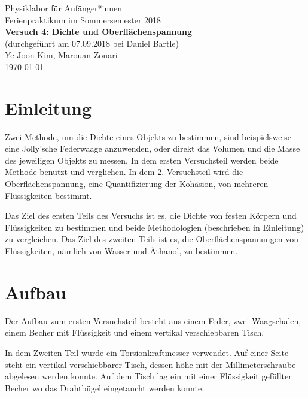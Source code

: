 \documentclass[11pt,a4paper]{article} %
\begin{document}
{
	\centering 
	\large 
	Physiklabor für Anfänger*innen \\
	Ferienpraktikum im Sommersemester 2018 \\[4mm]
	\textbf{\LARGE 
		Versuch 4: Dichte und Oberflächenspannung
	} \\[3mm]
	(durchgeführt am 07.09.2018 bei Daniel Bartle) \\
	Ye Joon Kim, Marouan Zouari\\
	\today \\[10mm]
}

\tableofcontents
\section{Einleitung}
Zwei Methode, um die Dichte eines Objekts zu bestimmen, sind beispielsweise eine Jolly'sche Federwaage anzuwenden, oder direkt das Volumen und die Masse des jeweiligen Objekts zu messen. In dem ersten Versuchsteil werden beide Methode benutzt und verglichen. In dem 2. Versuchsteil wird die Oberflächenspannung, eine Quantifizierung der Kohäsion, von mehreren Flüssigkeiten bestimmt. 

Das Ziel des ersten Teils des Versuchs ist es, die Dichte von festen Körpern und Flüssigkeiten zu bestimmen und beide Methodologien (beschrieben in Einleitung) zu vergleichen. Das Ziel des zweiten Teils ist es, die Oberflächenspannungen von Flüssigkeiten, nämlich von Wasser und Äthanol, zu bestimmen. 

\section{Aufbau}
Der Aufbau zum ersten Versuchsteil besteht aus einem Feder, zwei Waagschalen, einem Becher mit Flüssigkeit und einem vertikal verschiebbaren Tisch. 

In dem Zweiten Teil wurde ein Torsionkraftmesser verwendet. Auf einer Seite steht ein vertikal verschiebbarer Tisch, dessen höhe mit der Millimeterschraube abgelesen werden konnte. Auf dem Tisch lag ein mit einer Flüssigkeit gefüllter Becher wo das Drahtbügel eingetaucht werden konnte. 
\end{document}
